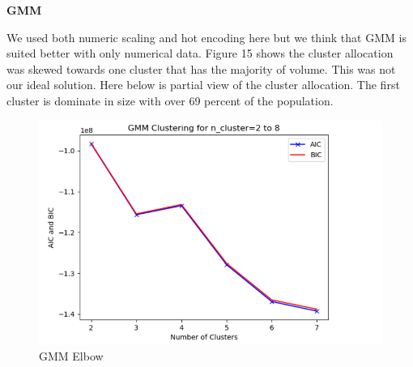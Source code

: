 \documentclass[conference]{IEEEtran}
\begin{document}
\begin{center} 
\textbf{GMM} 
\end{center}
We used both numeric scaling and hot encoding here but we think that GMM is suited better with only numerical data.  Figure 15 shows the cluster allocation was skewed towards one cluster that has the majority of volume.  This was not our ideal solution.  Here below is partial view of the cluster allocation.  The first cluster is dominate in size with over 69 percent of the population. 
\begin{figure}[!h]
	\includegraphics[width=\linewidth]{GMM_Clutering.png}
	\caption{GMM Elbow}
	\label{fig: GMM Elbow}
 \end{figure}
\end{document}
